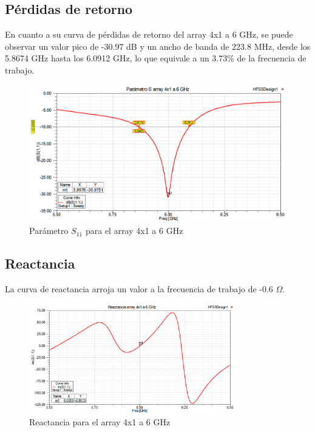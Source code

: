 \subsection{Pérdidas de retorno}
\par En cuanto a su curva de pérdidas de retorno del array 4x1 a 6 GHz, se puede observar un valor pico de -30.97 dB y un ancho de banda de 223.8 MHz, desde los 5.8674 GHz hasta los 6.0912 GHz, lo que equivale a un 3.73\% de la frecuencia de trabajo.
\\
\begin{figure}[H]
    \centering
        \includegraphics[width=\textwidth]{archivos/analisis/4x12/1}
        \caption{Parámetro $S_{11}$ para el array 4x1 a 6 GHz}
        \label{fig:s4x12}
\end{figure}

\newpage
\subsection{Reactancia}
\par La curva de reactancia arroja un valor a la frecuencia de trabajo de -0.6 $\Omega$. 
\\
\begin{figure}[H]
    \centering
        \includegraphics[width=0.8\textwidth]{archivos/analisis/4x12/2}
        \caption{Reactancia para el array 4x1 a 6 GHz}
        \label{fig:react4x12}
\end{figure}

